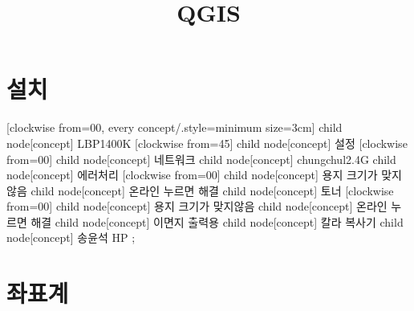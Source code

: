 \documentclass[12pt, a3paper, landscape, oneside]{book}
\let\stdsection\section
\renewcommand\section{\newpage\stdsection}
\begin{document}
			\dominitoc
			\doparttoc			




			\title{QGIS}
			\maketitle


			\tableofcontents 		%
			\cleardoublepage
			\listoftables 			%



	\section{설치}
	\pagestyle{empty}

		\begin{center}
		\tikz[	mindmap,
				text width=6em, 
				concept color=black!80,
				level 1/.style={level distance=5.5cm,sibling angle=45},
				level 2/.style={level distance=5.0cm,sibling angle=45},
				level 3/.style={level distance=5.0cm,sibling angle=45},
				level 4/.style={level distance=5.0cm,sibling angle=45},
				concept/.append style={fill={none}} 
				]
						[clockwise from=00, every concept/.style={minimum size=3cm}]
				child	{					node[concept] 	{LBP1400K}
						[clockwise from=45]
					child	{				node[concept] 	{설정}
						[clockwise from=00]
						child	{			node[concept] 	{네트워크}
							child	{		node[concept] 	{chungchul2.4G}} 
							} 
						}
					child	{				node[concept] 	{에러처리}
						[clockwise from=00]
						child	{			node[concept] 	{용지 크기가 맞지않음}
							child	{		node[concept] 	{온라인 누르면 해결}} 
							} 
						}
					child	{				node[concept] 	{토너}
						[clockwise from=00]
						child	{			node[concept] 	{용지 크기가 맞지않음}
							child	{		node[concept] 	{온라인 누르면 해결}} 
							} 
						}
					}
				child	{	node[concept] 	{이면지 출력용}
					}
				child	{	node[concept] 	{칼라 복사기}
					}
				child	{	node[concept] 	{송윤석 HP}
					};

		\end{center}

	\section{좌표계}
	\pagestyle{empty}
\end{document}
